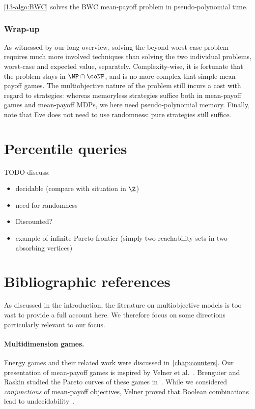 \begin{corollary}
\cref{13-algo:BWC} solves the BWC mean-payoff problem in pseudo-poly\-no\-mial time.
\end{corollary}

\subsubsection*{Wrap-up} As witnessed by our long overview, solving the beyond worst-case problem requires much more involved techniques than solving the two individual problems, worst-case and expected value, separately. Complexity-wise, it is fortunate that the problem stays in $\NP \cap \coNP$, and is no more complex that simple mean-payoff games. The multiobjective nature of the problem still incurs a cost with regard to strategies: whereas memoryless strategies suffice both in mean-payoff games and mean-payoff MDPs, we here need pseudo-polynomial memory. Finally, note that Eve does not need to use randomness: pure strategies still suffice.

\section{Percentile queries}
\label{13-sec:percentile}


TODO discuss:
\begin{itemize}
\item decidable (compare with situation in $\Z$)
\item need for randomness
\item Discounted?
\item example of infinite Pareto frontier (simply two reachability sets in two absorbing vertices)
\end{itemize}


\section*{Bibliographic references}

As discussed in the introduction, the literature on multiobjective models is too vast to provide a full account here. We therefore focus on some directions particularly relevant to our focus.

\paragraph{Multidimension games.} Energy games and their related work were discussed in~\cref{chap:counters}. Our presentation of mean-payoff games is inspired by Velner et al.~\cite{Velner&al:2015}. Brenguier and Raskin studied the Pareto curves of these games in~\cite{Brenguier&Raskin:2015}. While we considered \textit{conjunctions} of mean-payoff objectives, Velner proved that Boolean combinations lead to undecidability~\cite{Velner:2015}.

